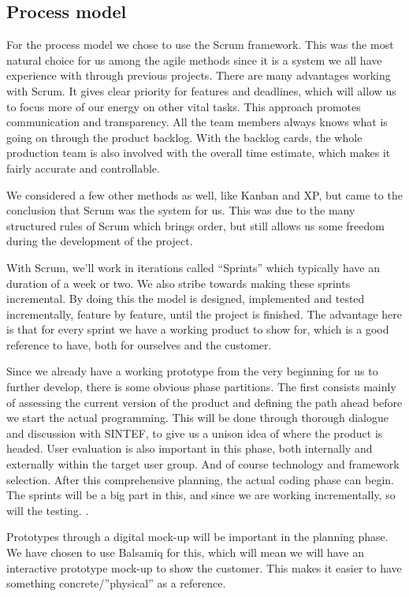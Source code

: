 	\subsection{Process model}
For the process model we chose to use the Scrum framework. This was the most natural choice for us among the agile methods since it is a system we all have experience with through previous projects. There are many advantages working with Scrum. It gives clear priority for features and deadlines, which will allow us to focus more of our energy on other vital tasks. This approach promotes communication and transparency. All the team members always knows what is going on through the product backlog. With the backlog cards, the whole production team is also involved with the overall time estimate, which makes it fairly accurate and controllable.

We considered a few other methods as well, like Kanban and XP, but came to the conclusion that Scrum was the system for us. This was due to the many structured rules of Scrum which brings order, but still allows us some freedom during the development of the project.

With Scrum, we’ll work in iterations called “Sprints” which typically have an duration of a week or two. We also stribe towards making these sprints incremental. By doing this the model is designed, implemented and tested incrementally, feature by feature, until the project is finished. The advantage here is that for every sprint we have a working product to show for, which is a good reference to have, both for ourselves and the customer. 

Since we already have a working prototype from the very beginning for us to further develop, there is some obvious phase partitions. The first consists mainly of assessing the current version of the product and defining the path ahead before we start the actual programming. This will be done through thorough dialogue and discussion with SINTEF, to give us a unison idea of where the product is headed. User evaluation is also important in this phase, both internally and externally within the target user group. And of course technology and framework selection. After this comprehensive planning, the actual coding phase can begin. The sprints will be a big part in this, and since we are working incrementally, so will the testing. .

Prototypes through a digital mock-up will be important in the planning phase. We have chosen to use Balsamiq for this, which will mean we will have an interactive prototype mock-up to show the customer. This makes it easier to have something concrete/”physical” as a reference.

